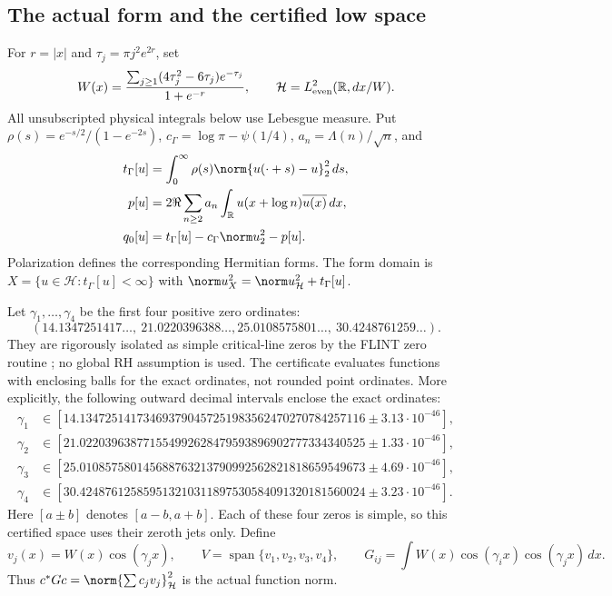 \documentclass[11pt,a4paper]{article}
\numberwithin{equation}{section}
\theoremstyle{definition}\newtheorem{definition}[theorem]{Definition}
\theoremstyle{remark}\newtheorem{remark}[theorem]{Remark}
\newcommand{\Hh}{\mathcal H}\newcommand{\Hw}{\mathcal H}
\begin{document}
\subsection{The actual form and the certified low space}

For $r=|x|$ and $\tau_j=\pi j^2e^{2r}$, set
\[
 W(x)=\frac{\sum_{j\ge1}(4\tau_j^2-6\tau_j)e^{-\tau_j}}{1+e^{-r}},
 \qquad \Hh=L^2_{\rm even}(\mathbb R,dx/W).
\]
All unsubscripted physical integrals below use Lebesgue measure. Put
$\rho(s)=e^{-s/2}/(1-e^{-2s})$, $c_\Gamma=\log\pi-\psi(1/4)$,
$a_n=\Lambda(n)/\sqrt n$, and
\begin{align}
 t_\Gamma[u]&=\int_0^\infty\rho(s)\norm{u(\cdot+s)-u}_2^2\,ds,\\
 p[u]&=2\Re\sum_{n\ge2}a_n\int_{\mathbb R}u(x+\log n)\overline{u(x)}\,dx,\\
 q_0[u]&=t_\Gamma[u]-c_\Gamma\norm u_2^2-p[u].\label{fz:eq:q}
\end{align}
Polarization defines the corresponding Hermitian forms. The form domain is
$X=\{u\in\Hh:t_\Gamma[u]<\infty\}$ with
$\norm u_{X}^2=\norm u_{\Hh}^2+t_\Gamma[u]$.

Let $\gamma_1,\ldots,\gamma_4$ be the first four positive zero ordinates:
\[
 (14.1347251417\ldots,\ 21.0220396388\ldots,
   25.0108575801\ldots,\ 30.4248761259\ldots).
\]
They are rigorously isolated as simple critical-line zeros by the FLINT
zero routine \cite{fzFlintZeros}; no global RH assumption is used. The
certificate evaluates functions with enclosing balls for the exact
ordinates, not rounded point ordinates. More explicitly, the following outward decimal intervals enclose the exact
ordinates:
\begin{align*}
\gamma_1&\in[14.134725141734693790457251983562470270784257116
                 \mathbin{\pm}3.13\cdot10^{-46}],\\
\gamma_2&\in[21.022039638771554992628479593896902777334340525
                 \mathbin{\pm}1.33\cdot10^{-46}],\\
\gamma_3&\in[25.010857580145688763213790992562821818659549673
                 \mathbin{\pm}4.69\cdot10^{-46}],\\
\gamma_4&\in[30.424876125859513210311897530584091320181560024
                 \mathbin{\pm}3.23\cdot10^{-46}].
\end{align*}
Here $[a\mathbin{\pm}b]$ denotes $[a-b,a+b]$. Each of these four zeros
is simple, so this certified space uses their zeroth jets only. Define
\[
 v_j(x)=W(x)\cos(\gamma_jx),\qquad V=\operatorname{span}\{v_1,v_2,v_3,v_4\},
 \qquad G_{ij}=\int W(x)\cos(\gamma_ix)\cos(\gamma_jx)\,dx.
\]
Thus $c^*Gc=\norm{\sum c_jv_j}_{\Hh}^2$ is the actual function norm.
\end{document}
